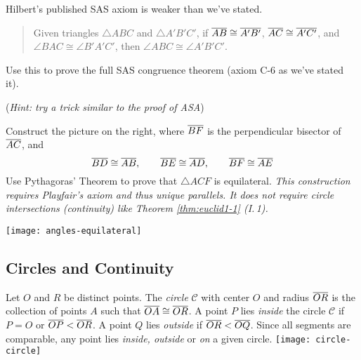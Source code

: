 \begin{exercises}
\begin{enumerate}
	  
	  \item\label{exs:hilbertsas} Hilbert's published SAS axiom is weaker than we've stated.
		\begin{quote}
			Given triangles $\triangle ABC$ and $\triangle A'B'C'$, if $\overline{AB}\cong\overline{A'B'}$, $\overline{AC}\cong\overline{A'C'}$, and $\angle BAC\cong\angle B'A'C'$, then $\angle ABC\cong\angle A'B'C'$. 
		\end{quote}
		Use this to prove the full SAS congruence theorem (axiom C-6 as we've stated it).\par
		(\emph{Hint: try a trick similar to the proof of ASA})
		
		
		\begin{minipage}[t]{0.7\linewidth}\vspace{0pt}
		  \item\label{ex:pythagnocont} Construct the picture on the right, where $\overline{BF}$ is the perpendicular bisector of $\overline{AC}$, and
		  \[
		  	\overline{BD}\cong\overline{AB},\qquad \overline{BE}\cong\overline{AD},\qquad \overline{BF}\cong\overline{AE}
		  \]
		  Use Pythagoras' Theorem to prove that $\triangle ACF$ is equilateral.\smallbreak
		  \emph{This construction requires Playfair's axiom and thus unique parallels. It does not require circle intersections (continuity) like Theorem \ref{thm:euclid1-1} (I.\,1).}
	  \end{minipage}
	  \hfill
	  \begin{minipage}[t]{0.29\linewidth}\vspace{-5pt}
	  	\flushright
	  	\texttt{[image: angles-equilateral]}
	  \end{minipage}
	  \smallbreak
	\end{enumerate}
\end{exercises}


\clearpage

\subsection{Circles and Continuity}\label{sec:circ}

\begin{defn}[lower separated=false, sidebyside, sidebyside align=top seam, sidebyside gap=0pt, righthand width=0.22\linewidth]{}{}
	Let $O$ and $R$ be distinct points. The \emph{circle} $\mathcal C$ with center $O$ and radius $\overline{OR}$ is the collection of points $A$ such that $\overline{OA}\cong\overline{OR}$.\smallbreak
	A point $P$ lies \emph{inside} the circle $\mathcal C$ if $P=O$ or $\overline{OP}<\overline{OR}$.\smallbreak
	A point $Q$ lies \emph{outside} if $\overline{OR}<\overline{OQ}$.\smallbreak
	Since all segments are comparable, any point lies \emph{inside, outside} or \emph{on} a given circle.
	\tcblower
	\flushright\texttt{[image: circle-circle]}
\end{defn}

